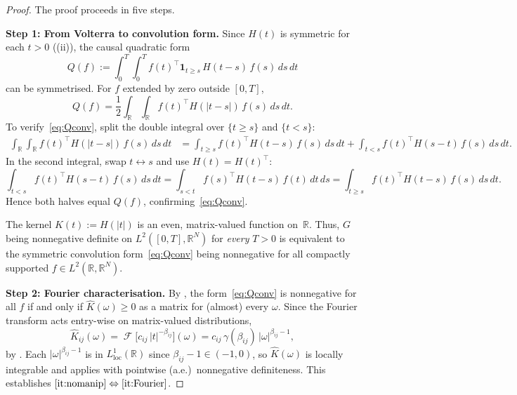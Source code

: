 \documentclass[12pt]{article}
\theoremstyle{definition}
\theoremstyle{remark}
\newcommand{\R}{\mathbb{R}}
\DeclareMathOperator{\FT}{\mathcal{F}}
\begin{document}
\begin{proof}
The proof proceeds in five steps.

\medskip
\noindent\textbf{Step 1: From Volterra to convolution form.}
Since $H(t)$ is symmetric for each $t>0$ ((ii)), the causal quadratic form
\[
  Q(f) := \int_0^T\!\int_0^T f(t)^\top \mathbf{1}_{t\ge s}\,H(t-s)\,f(s)\,ds\,dt
\]
can be symmetrised.  For $f$ extended by zero outside $[0,T]$,
\begin{equation}\label{eq:Qconv}
  Q(f) = \frac{1}{2}\int_{\R}\!\int_{\R} f(t)^\top H(|t-s|)\,f(s)\,ds\,dt.
\end{equation}
To verify~\eqref{eq:Qconv}, split the double integral over $\{t\ge s\}$ and $\{t<s\}$:
\begin{align*}
  \int_{\R}\!\int_{\R} f(t)^\top H(|t-s|)\,f(s)\,ds\,dt
  &= \int_{t\ge s} f(t)^\top H(t-s)\,f(s)\,ds\,dt
    + \int_{t<s} f(t)^\top H(s-t)\,f(s)\,ds\,dt.
\end{align*}
In the second integral, swap $t\leftrightarrow s$ and use $H(t)=H(t)^\top$:
\[
  \int_{t<s} f(t)^\top H(s-t)\,f(s)\,ds\,dt
  = \int_{s<t} f(s)^\top H(t-s)\,f(t)\,dt\,ds
  = \int_{t\ge s} f(t)^\top H(t-s)\,f(s)\,ds\,dt.
\]
Hence both halves equal $Q(f)$, confirming~\eqref{eq:Qconv}.

The kernel $K(t):=H(|t|)$ is an even, matrix-valued function on~$\R$.
Thus, $G$ being nonnegative definite on $L^2([0,T],\R^N)$ for \emph{every} $T>0$ is
equivalent to the symmetric convolution form~\eqref{eq:Qconv} being nonnegative for all
compactly supported $f\in L^2(\R,\R^N)$.

\medskip
\noindent\textbf{Step 2: Fourier characterisation.}
By , the form~\eqref{eq:Qconv} is nonnegative for all $f$ if and only if
$\widehat{K}(\omega)\ge 0$ as a matrix for (almost) every $\omega$.
Since the Fourier transform acts entry-wise on matrix-valued distributions,
\[
  \widehat{K}_{ij}(\omega)
  = \FT\bigl[c_{ij}\,|t|^{-\beta_{ij}}\bigr](\omega)
  = c_{ij}\,\gamma(\beta_{ij})\,|\omega|^{\beta_{ij}-1},
\]
by .  Each $|\omega|^{\beta_{ij}-1}$ is in $L^1_{\mathrm{loc}}(\R)$ since
$\beta_{ij}-1\in(-1,0)$, so $\widehat{K}(\omega)$ is locally integrable and
 applies with pointwise (a.e.)\ nonnegative definiteness.
This establishes $\ref{it:nomanip}\Leftrightarrow\ref{it:Fourier}$.


\end{proof}
\end{document}
